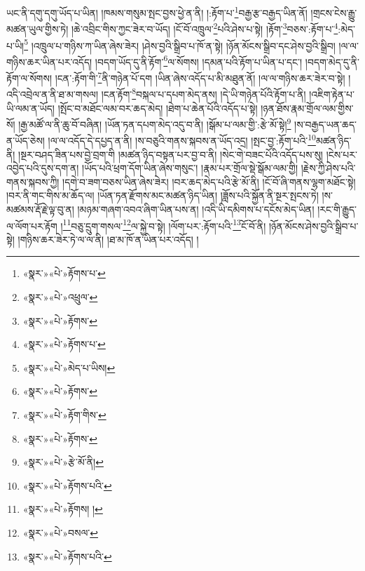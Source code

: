 ཡང་ནི་དགུ་དགུ་ཡོད་པ་ཡིན། །ཁམས་གསུམ་སྤང་བྱས་ཕྱེ་ན་ནི། །:རྟོག་པ་\footnote{«སྣར་»«པེ་»རྟོགས་པ་}བརྒྱ་རྩ་བརྒྱད་ཡིན་ནོ། །གྲངས་ངེས་རྒྱུ་མཚན་ཡུལ་གྱིས་ཏེ། །ཆེ་འབྲིང་གིས་ཀྱང་ཟེར་བ་ཡོད། །ངོ་བོ་འཁྲུལ་\footnote{«སྣར་»«པེ་»འཕྲུལ་}པའི་ཤེས་པ་སྟེ། །རྟོག་\footnote{«སྣར་»«པེ་»རྟོགས་}བཅས་:རྟོག་པ་\footnote{«སྣར་»«པེ་»རྟོགས་པ་}:མེད་པ་ཡི།\footnote{«སྣར་»«པེ་»མེད་པ་ཡིས།} །འཁྲུལ་པ་གཉིས་ཀ་ཡིན་ཞེས་ཟེར། །ཤེས་བྱའི་སྒྲིབ་པ་ཁོ་ན་སྟེ། །ཉོན་མོངས་སྒྲིབ་དང་ཤེས་བྱའི་སྒྲིབ། །ལ་ལ་གཉིས་ཆར་ཡིན་པར་འདོད། །བདག་ཡོད་དུ་ནི་རྟོག་\footnote{«སྣར་»«པེ་»རྟོགས་}ལ་སོགས། །དམན་པའི་རྟོག་པ་ཡིན་པ་དང་། །བདག་མེད་དུ་ནི་རྟོག་ལ་སོགས། །ངན་:རྟོག་གི་\footnote{«སྣར་»«པེ་»རྟོག་གིས་}ནི་གཉེན་པོ་དག །ཡིན་ཞེས་འདོད་པ་མི་མཐུན་ནོ། །ལ་ལ་གཉིས་ཆར་ཟེར་བ་སྟེ། །འདི་འབྲེལ་ན་ནི་ཐ་མ་གསལ། །ངན་རྟོག་\footnote{«སྣར་»«པེ་»རྟོགས་}བསྐལ་པ་དཔག་མེད་ནས། །དེ་ཡི་གཉེན་པོའི་རྟོག་པ་ནི། །འཇིག་རྟེན་པ་ཡི་ལམ་ན་ཡོད། །སྤོང་བ་མཐོང་ལམ་བར་ཆད་མེད། །ཐེག་པ་ཆེན་པོའི་འདོད་པ་སྟེ། །ཉན་ཐོས་རྣམ་གྲོལ་ལམ་གྱིས་སོ། །རྒྱ་མཚོ་ལ་ནི་ཆུ་བོ་བཞིན། །ཡོན་ཏན་དཔག་མེད་འདུ་བ་ནི། །སྒོམ་པ་ལམ་གྱི་:རྩེ་མོ་སྟེ།\footnote{«སྣར་»«པེ་»རྩེ་མོ་ནི།} །ས་བརྒྱད་ཡན་ཆད་ན་ཡོད་ཅེས། །ལ་ལ་འདོད་དེ་དཔྱད་ན་ནི། །ས་བཅུའི་གནས་སྐབས་ན་ཡོད་འདྲ། །སྤང་བྱ་:རྟོག་པའི་\footnote{«སྣར་»«པེ་»རྟོགས་པའི་}མཚན་ཉིད་ནི། །སྔར་བཤད་ཟིན་པས་བྱེ་བྲག་གི །མཚན་ཉིད་བསྟན་པར་བྱ་བ་ནི། །སེང་གེ་བཟང་པོའི་འདོད་པས་སུ། །ངེས་པར་འབྱེད་པའི་དུས་དག་ན། །ཡོད་པའི་ཕྲག་དོག་ཡིན་ཞེས་གསུང་། །རྣམ་པར་གྲོལ་སྡེ་སྒོམ་ལམ་གྱི། །རྗེས་ཀྱི་ཤེས་པའི་གནས་སྐབས་ཀྱི། །དགེ་བ་ཟག་བཅས་ཡིན་ཞེས་ཟེར། །བར་ཆད་མེད་པའི་རྩེ་མོ་ནི། །ངོ་བོ་ཞི་གནས་ལྷག་མཐོང་སྟེ། །བར་ནི་གང་གིས་མ་ཆོད་ལ། །ཡོན་ཏན་རྫོགས་མང་མཚན་ཉིད་ཡིན། །ཟློས་པའི་སྐྱོན་ནི་སྔར་སྤངས་ཏེ། །ས་མཚམས་རྡོ་རྗེ་ལྟ་བུ་ན། །མཉམ་གཞག་འབའ་ཞིག་ཡིན་པས་ན། །འདི་ཡི་དམིགས་པ་དངོས་མེད་ཡིན། །རང་གི་རྒྱུད་ལ་ལོག་པར་རྟོག །\footnote{«སྣར་»«པེ་»རྟོགས། །}བཅུ་དྲུག་གསལ་\footnote{«སྣར་»«པེ་»བསལ་}ལ་སྐྱེ་བ་སྟེ། །ལོག་པར་:རྟོག་པའི་\footnote{«སྣར་»«པེ་»རྟོགས་པའི་}ངོ་བོ་ནི། །ཉོན་མོངས་ཤེས་བྱའི་སྒྲིབ་པ་སྟེ། །གཉིས་ཆར་ཟེར་ཏེ་ལ་ལ་ནི། །ཐ་མ་ཁོ་ན་ཡིན་པར་འདོད། །
